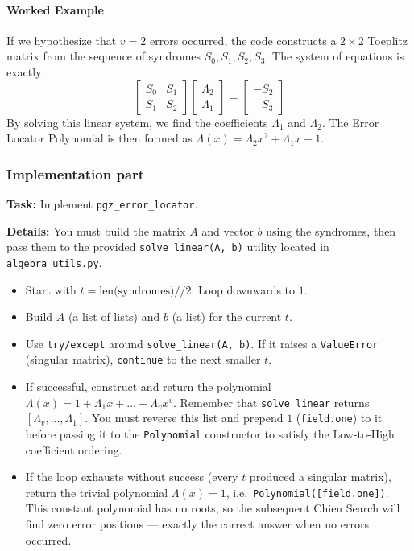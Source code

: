 \paragraph{Worked Example}
If we hypothesize that $v=2$ errors occurred, the code constructs a $2 \times 2$ Toeplitz matrix from the sequence of syndromes $S_0, S_1, S_2, S_3$. The system of equations is exactly:
\[
\begin{bmatrix}
S_0 & S_1 \\
S_1 & S_2
\end{bmatrix}
\begin{bmatrix}
\Lambda_2 \\
\Lambda_1
\end{bmatrix}
=
\begin{bmatrix}
-S_2 \\
-S_3
\end{bmatrix}
\]
By solving this linear system, we find the coefficients $\Lambda_1$ and $\Lambda_2$. The Error Locator Polynomial is then formed as $\Lambda(x) = \Lambda_2 x^2 + \Lambda_1 x + 1$. 

\subsubsection*{Implementation part}
\textbf{Task:} Implement \lstinline|pgz_error_locator|.

\textbf{Details:} 
You must build the matrix $A$ and vector $b$ using the syndromes, then pass them to the provided \lstinline|solve_linear(A, b)| utility located in \lstinline|algebra_utils.py|. 
\begin{itemize}
    \item Start with $t = \text{len(syndromes)} // 2$. Loop downwards to $1$.
    \item Build $A$ (a list of lists) and $b$ (a list) for the current $t$.
    \item Use \lstinline|try/except| around \lstinline|solve_linear(A, b)|. If it raises a \lstinline|ValueError| (singular matrix), \lstinline|continue| to the next smaller $t$.
    \item If successful, construct and return the polynomial $\Lambda(x) = 1 + \Lambda_1 x + \dots + \Lambda_v x^v$. Remember that \lstinline|solve_linear| returns $[\Lambda_v, \dots, \Lambda_1]$. You must reverse this list and prepend $1$ (\lstinline|field.one|) to it before passing it to the \lstinline|Polynomial| constructor to satisfy the Low-to-High coefficient ordering.
    \item If the loop exhausts without success (every $t$ produced a singular matrix), return the trivial polynomial $\Lambda(x) = 1$, i.e.\ \lstinline|Polynomial([field.one])|. This constant polynomial has no roots, so the subsequent Chien Search will find zero error positions --- exactly the correct answer when no errors occurred.
\end{itemize}

